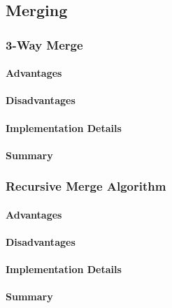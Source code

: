 \subsection{Merging}


\subsubsection{3-Way Merge}

\paragraph{Advantages}
\paragraph{Disadvantages}

\paragraph{Implementation Details}

\paragraph{Summary}


\subsubsection{Recursive Merge Algorithm}

\paragraph{Advantages}
\paragraph{Disadvantages}

\paragraph{Implementation Details}

\paragraph{Summary}

